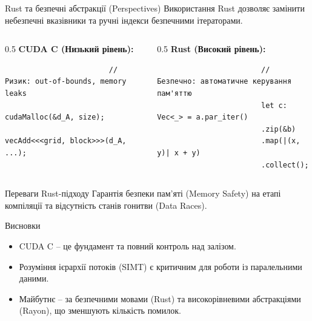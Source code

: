 \documentclass[10pt]{beamer}
\begin{document}
	\begin{frame}[fragile]{Rust та безпечні абстракції (Perspectives)}
		Використання Rust дозволяє замінити небезпечні вказівники та ручні індекси безпечними ітераторами.
		\begin{columns}
			\begin{column}{0.5\textwidth}
				\textbf{CUDA C (Низький рівень):}
				\begin{tiny}
					\begin{verbatim}
						// Ризик: out-of-bounds, memory leaks
						cudaMalloc(&d_A, size);
						vecAdd<<<grid, block>>>(d_A, ...);
					\end{verbatim}
				\end{tiny}
			\end{column}
			\begin{column}{0.5\textwidth}
				\textbf{Rust (Високий рівень):}
				\begin{tiny}
					\begin{verbatim}
						// Безпечно: автоматичне керування пам'яттю
						let c: Vec<_> = a.par_iter()
						.zip(&b)
						.map(|(x, y)| x + y)
						.collect();
					\end{verbatim}
				\end{tiny}
			\end{column}
		\end{columns}
		\begin{alertblock}{Переваги Rust-підходу}
			Гарантія безпеки пам'яті (Memory Safety) на етапі компіляції та відсутність станів гонитви (Data Races).
		\end{alertblock}
	\end{frame}
	
	\begin{frame}{Висновки}
		\begin{itemize}
			\item CUDA C -- це фундамент та повний контроль над залізом.
			\item Розуміння ієрархії потоків (SIMT) є критичним для роботи із паралельними даними.
			\item Майбутнє -- за безпечними мовами (Rust) та високорівневими абстракціями (Rayon), що зменшують кількість помилок.
		\end{itemize}
	\end{frame}
	
\end{document}
